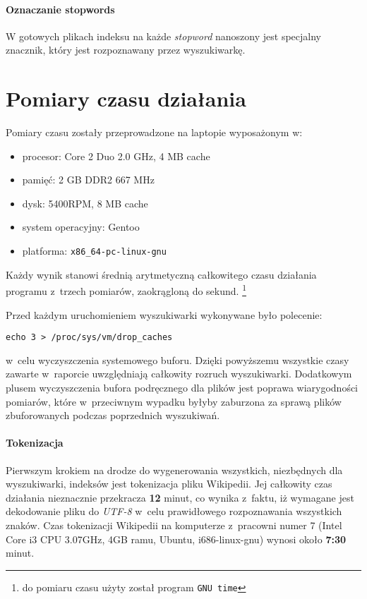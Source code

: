 \documentclass[a4paper,12pt]{article}
\begin{document}
\paragraph{Oznaczanie stopwords} W gotowych plikach indeksu na każde
\textit{stopword} nanoszony jest specjalny znacznik, który jest rozpoznawany
przez wyszukiwarkę.

\section{Pomiary czasu działania}
Pomiary czasu zostały przeprowadzone na laptopie wyposażonym w:
\begin{itemize}
  \item procesor: Core 2 Duo 2.0 GHz, 4 MB cache
  \item pamięć: 2 GB DDR2 667 MHz
  \item dysk: 5400RPM, 8 MB cache
  \item system operacyjny: Gentoo
  \item platforma: \texttt{x86\_64-pc-linux-gnu}
\end{itemize}
Każdy wynik stanowi średnią arytmetyczną całkowitego czasu działania programu
z~trzech pomiarów, zaokrągloną do sekund.
\footnote{do pomiaru czasu użyty został program \texttt{GNU time}}

Przed każdym uruchomieniem wyszukiwarki wykonywane było polecenie:
\begin{verbatim}
echo 3 > /proc/sys/vm/drop_caches
\end{verbatim}
w~celu wyczyszczenia systemowego buforu. Dzięki powyższemu wszystkie czasy zawarte
w~raporcie uwzględniają całkowity rozruch wyszukiwarki. Dodatkowym plusem
wyczyszczenia bufora podręcznego dla plików jest poprawa wiarygodności
pomiarów, które w~przeciwnym wypadku byłyby zaburzona za sprawą plików
zbuforowanych podczas poprzednich wyszukiwań.

\paragraph{Tokenizacja}
Pierwszym krokiem na drodze do wygenerowania wszystkich, niezbędnych dla
wyszukiwarki, indeksów jest tokenizacja pliku Wikipedii. Jej całkowity czas
działania nieznacznie przekracza \textbf{12} minut, co wynika z~faktu, iż wymagane jest
dekodowanie pliku do \textit{UTF-8} w~celu prawidłowego rozpoznawania
wszystkich znaków. Czas tokenizacji Wikipedii na komputerze z~pracowni numer 7
(Intel Core i3 CPU 3.07GHz, 4GB ramu, Ubuntu, i686-linux-gnu) wynosi około \textbf{7:30}
minut.
\end{document}
